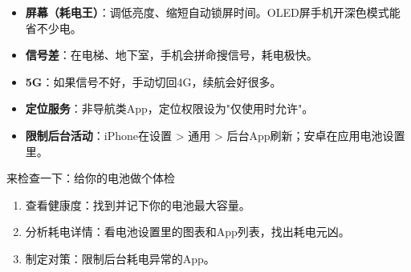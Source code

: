 
\begin{itemize}
  \item \textbf{屏幕（耗电王）}：调低亮度、缩短自动锁屏时间。OLED屏手机开深色模式能省不少电。
  \item \textbf{信号差}：在电梯、地下室，手机会拼命搜信号，耗电极快。
  \item \textbf{5G}：如果信号不好，手动切回4G，续航会好很多。
  \item \textbf{定位服务}：非导航类App，定位权限设为"仅使用时允许"。
  \item \textbf{限制后台活动}：iPhone在设置 > 通用 > 后台App刷新；安卓在应用电池设置里。
\end{itemize}

\begin{tcbpractice}{来检查一下：给你的电池做个体检}
\begin{enumerate}
  \item 查看健康度：找到并记下你的电池最大容量。
  \item 分析耗电详情：看电池设置里的图表和App列表，找出耗电元凶。
  \item 制定对策：限制后台耗电异常的App。
\end{enumerate}

\end{tcbpractice}
